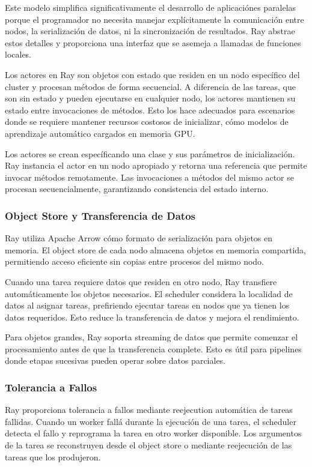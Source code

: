 \documentclass[12pt,a4paper,twoside]{book}
\begin{document}
Este modelo simplifica significativamente el desarrollo de aplicaciónes paralelas porque el programador no necesita manejar explícitamente la comunicación entre nodos, la serialización de datos, ni la sincronización de resultados. Ray abstrae estos detalles y proporciona una interfaz que se asemeja a llamadas de funciones locales.

Los actores en Ray son objetos con estado que residen en un nodo específico del cluster y procesan métodos de forma secuencial. A diferencia de las tareas, que son sin estado y pueden ejecutarse en cualquier nodo, los actores mantienen su estado entre invocaciones de métodos. Esto los hace adecuados para escenarios donde se requiere mantener recursos costosos de inicializar, cómo modelos de aprendizaje automático cargados en memoria GPU.

Los actores se crean específicando una clase y sus parámetros de inicialización. Ray instancia el actor en un nodo apropiado y retorna una referencia que permite invocar métodos remotamente. Las invocaciones a métodos del mismo actor se procesan secuencialmente, garantizando consistencia del estado interno.

\subsubsection{Object Store y Transferencia de Datos}

Ray utiliza Apache Arrow cómo formato de serialización para objetos en memoria. El object store de cada nodo almacena objetos en memoria compartida, permitiendo acceso eficiente sin copias entre procesos del mismo nodo.

Cuando una tarea requiere datos que residen en otro nodo, Ray transfiere automáticamente los objetos necesarios. El scheduler considera la localidad de datos al asignar tareas, prefiriendo ejecutar tareas en nodos que ya tienen los datos requeridos. Esto reduce la transferencia de datos y mejora el rendimiento.

Para objetos grandes, Ray soporta streaming de datos que permite comenzar el procesamiento antes de que la transferencia complete. Esto es útil para pipelines donde etapas sucesivas pueden operar sobre datos parciales.

\subsubsection{Tolerancia a Fallos}

Ray proporciona tolerancia a fallos mediante reejecution automática de tareas fallidas. Cuando un worker fallá durante la ejecución de una tarea, el scheduler detecta el fallo y reprograma la tarea en otro worker disponible. Los argumentos de la tarea se reconstruyen desde el object store o mediante reejecución de las tareas que los produjeron.
\end{document}
